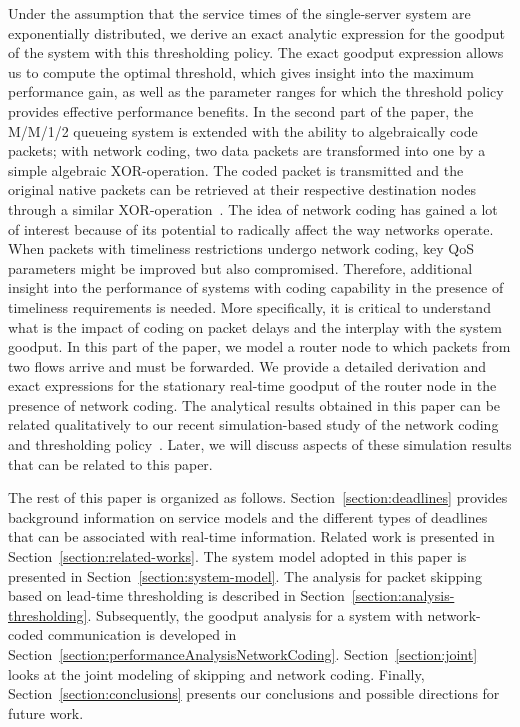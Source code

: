 \documentclass[preprint,12pt]{elsarticle}
\theoremstyle{definition}
\theoremstyle{plain}
\theoremstyle{remark}
\begin{document}
Under the assumption that the service times of the single-server system are exponentially distributed, we derive an exact analytic expression for the goodput of the system with this thresholding policy. The exact goodput expression allows us to compute the optimal threshold, which gives insight into the maximum performance gain, as well as the parameter ranges for which the threshold policy provides effective performance benefits. In the second part of the paper, the M/M/1/2 queueing system is extended with the ability to algebraically code packets; with network coding, two data packets are transformed into one by a simple algebraic XOR-operation. The coded packet is transmitted and the original native packets can be retrieved at their respective destination nodes through a similar XOR-operation~\cite{ahlswede:network-coding}. The idea of network coding has gained a lot of interest because of its potential to radically affect the way networks operate. When packets with timeliness restrictions undergo network coding, key QoS parameters might be improved but also compromised. Therefore, additional insight into the performance of systems with coding capability in the presence of timeliness requirements is needed. More specifically, it is critical to understand what is the impact of coding on packet delays and the interplay with the system goodput. In this part of the paper, we model a router node to which packets from two flows arrive and must be forwarded. We provide a detailed derivation and exact expressions for the stationary real-time goodput of the router node in the presence of network coding. The analytical results obtained in this paper can be related qualitatively to our recent simulation-based study of the network coding and thresholding policy~\cite{aoun-ewsn2011}. Later, we will discuss aspects of these simulation results that can be related to this paper.

The rest of this paper is organized as follows. Section~\ref{section:deadlines} provides background information on service models and the different types of deadlines that can be associated with real-time information. Related work is presented in Section~\ref{section:related-works}. The system model adopted in this paper is presented in Section~\ref{section:system-model}. The analysis for packet skipping based on lead-time thresholding is described in Section~\ref{section:analysis-thresholding}. Subsequently, the goodput analysis for a system with network-coded communication is developed in Section~\ref{section:performanceAnalysisNetworkCoding}. Section~\ref{section:joint} looks at the joint modeling of skipping and network coding. Finally, Section~\ref{section:conclusions} presents our conclusions and possible directions for future work.
\end{document}
